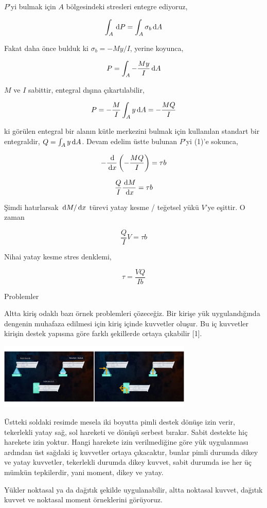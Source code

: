 \documentclass[12pt,fleqn]{article}\usepackage{../../common}
\begin{document}
$P$'yi bulmak için $A$ bölgesindeki stresleri entegre ediyoruz,

$$
\int_A \,\mathrm{d} P = \int_A \sigma_b \,\mathrm{d} A
$$

Fakat daha önce bulduk ki $\sigma_b = -My / I$, yerine koyunca,

$$
P = \int_A - \frac{My}{I} \,\mathrm{d} A
$$

$M$ ve $I$ sabittir, entegral dışına çıkartılabilir,

$$
P = - \frac{M}{I} \int_A y \,\mathrm{d} A = - \frac{MQ}{I}
$$

ki görülen entegral bir alanın kütle merkezini bulmak için kullanılan standart
bir entegraldir, $Q = \int_A y \,\mathrm{d} A$. Devam edelim üstte bulunan $P$'yi (1)'e
sokunca,

$$
- \frac{\,\mathrm{d}}{\,\mathrm{d} x} \left( - \frac{MQ}{I} \right) = \tau b
$$

$$
\frac{Q}{I} \frac{\,\mathrm{d} M}{\,\mathrm{d} x} = \tau b
$$

Şimdi hatırlarsak $\,\mathrm{d} M/\,\mathrm{d} x$ türevi yatay kesme / teğetsel yükü $V$'ye
eşittir. O zaman

$$
\frac{Q}{I} V = \tau b
$$

Nihai yatay kesme stres denklemi,

$$
\tau = \frac{V Q}{I b}
$$

Problemler

Altta kiriş odaklı bazı örnek problemleri çözeceğiz. Bir kirişe yük
uygulandığında dengenin muhafaza edilmesi için kiriş içinde kuvvetler oluşur.
Bu iç kuvvetler kirişin destek yapısına göre farklı şekillerde ortaya çıkabilir
[1].

\includegraphics[width=25em]{phy_020_strs_01b_01.jpg}

Üstteki soldaki resimde mesela iki boyutta pimli destek dönüşe izin verir,
tekerlekli yatay sağ, sol hareketi ve dönüşü serbest bırakır. Sabit destekte hiç
harekete izin yoktur. Hangi harekete izin verilmediğine göre yük uygulanması
ardından üst sağdaki iç kuvvetler ortaya çıkacaktır, bunlar pimli durumda dikey
ve yatay kuvvetler, tekerlekli durumda dikey kuvvet, sabit durumda ise her üç
mümkün tepkilerdir, yani moment, dikey ve yatay.

Yükler noktasal ya da dağıtık şekilde uygulanabilir, altta noktasal kuvvet,
dağıtık kuvvet ve noktasal moment örneklerini görüyoruz.
\end{document}
